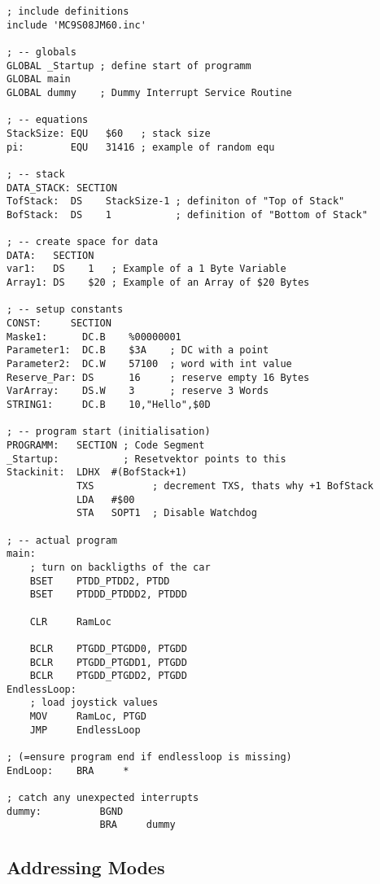 \begin{lstlisting}
; include definitions
include 'MC9S08JM60.inc'

; -- globals
GLOBAL _Startup ; define start of programm
GLOBAL main
GLOBAL dummy    ; Dummy Interrupt Service Routine

; -- equations
StackSize: EQU   $60   ; stack size
pi:        EQU   31416 ; example of random equ

; -- stack
DATA_STACK: SECTION
TofStack:  DS    StackSize-1 ; definiton of "Top of Stack"
BofStack:  DS    1           ; definition of "Bottom of Stack"

; -- create space for data
DATA:   SECTION
var1:   DS    1   ; Example of a 1 Byte Variable
Array1: DS    $20 ; Example of an Array of $20 Bytes

; -- setup constants
CONST:     SECTION
Maske1:      DC.B    %00000001
Parameter1:  DC.B    $3A    ; DC with a point
Parameter2:  DC.W    57100  ; word with int value
Reserve_Par: DS      16     ; reserve empty 16 Bytes
VarArray:    DS.W    3      ; reserve 3 Words
STRING1:     DC.B    10,"Hello",$0D

; -- program start (initialisation)
PROGRAMM:   SECTION ; Code Segment
_Startup:           ; Resetvektor points to this
Stackinit:  LDHX  #(BofStack+1)
            TXS          ; decrement TXS, thats why +1 BofStack
            LDA   #$00
            STA   SOPT1  ; Disable Watchdog

; -- actual program
main:
    ; turn on backligths of the car
    BSET    PTDD_PTDD2, PTDD
    BSET    PTDDD_PTDDD2, PTDDD

    CLR     RamLoc

    BCLR    PTGDD_PTGDD0, PTGDD
    BCLR    PTGDD_PTGDD1, PTGDD
    BCLR    PTGDD_PTGDD2, PTGDD
EndlessLoop:
    ; load joystick values
    MOV     RamLoc, PTGD
    JMP     EndlessLoop

; (=ensure program end if endlessloop is missing)
EndLoop:    BRA     *

; catch any unexpected interrupts
dummy:          BGND
                BRA     dummy

\end{lstlisting}

\subsection{Addressing Modes}



